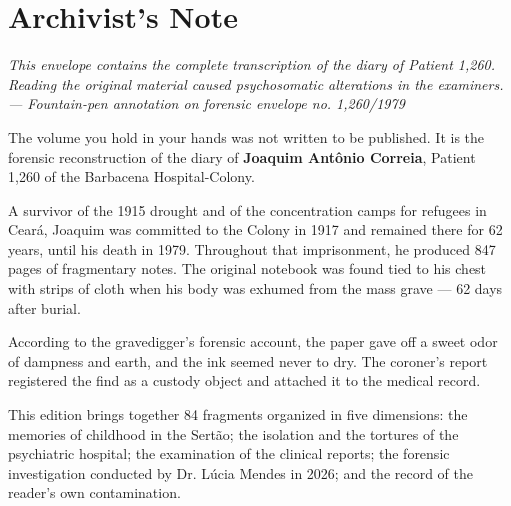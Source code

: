 \cleardoublepage
\thispagestyle{empty}
\chapter*{Archivist's Note}

\begin{center}
\itshape\small
This envelope contains the complete transcription of the diary of Patient 1,260.\\
Reading the original material caused psychosomatic alterations in the examiners.\\[0.5em]
\upshape\scriptsize --- Fountain-pen annotation on forensic envelope no. 1,260/1979
\end{center}

\vspace{1.2em}

\begingroup

The volume you hold in your hands was not written to be published. It is the forensic reconstruction of the diary of \textbf{Joaquim Antônio Correia}, Patient 1,260 of the Barbacena Hospital-Colony.

A survivor of the 1915 drought and of the concentration camps for refugees in Ceará, Joaquim was committed to the Colony in 1917 and remained there for 62 years, until his death in 1979. Throughout that imprisonment, he produced 847 pages of fragmentary notes. The original notebook was found tied to his chest with strips of cloth when his body was exhumed from the mass grave --- 62 days after burial.

\vspace{0.4em}
\noindent According to the gravedigger's forensic account, the paper gave off a sweet odor of dampness and earth, and the ink seemed never to dry. The coroner's report registered the find as a custody object and attached it to the medical record.

\vspace{0.6em}
This edition brings together 84 fragments organized in five dimensions: the memories of childhood in the Sertão; the isolation and the tortures of the psychiatric hospital; the examination of the clinical reports; the forensic investigation conducted by Dr. Lúcia Mendes in 2026; and the record of the reader's own contamination.

